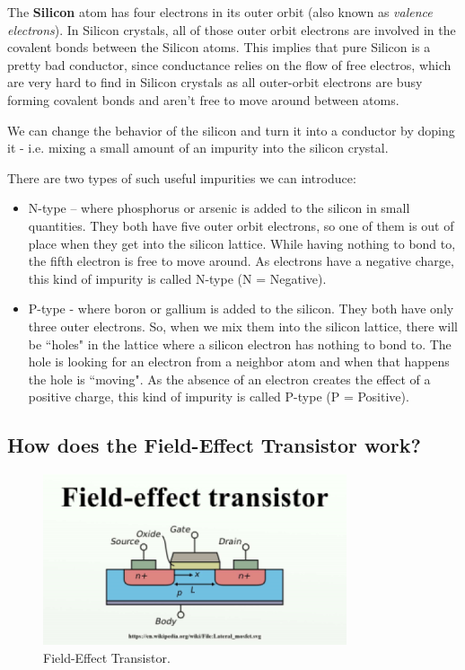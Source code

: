 The \textbf{Silicon} atom has four electrons in its outer orbit (also known as \textit{valence electrons}).
In Silicon crystals, all of those outer orbit electrons are involved in the covalent bonds between the Silicon atoms.
This implies that pure Silicon is a pretty bad conductor, 
since conductance relies on the flow of free electros,
which are very hard to find in Silicon crystals as all outer-orbit electrons are busy forming covalent bonds and aren't free to move around between atoms.

We can change the behavior of the silicon and turn it into a conductor by doping it - i.e. mixing a small amount of an impurity into the silicon crystal.

There are two types of such useful impurities we can introduce:
\begin{itemize}
    \item N-type – where phosphorus or arsenic is added to the silicon in small
    quantities. They both have five outer orbit electrons, so one of them is out of
    place when they get into the silicon lattice. While having nothing to bond
    to, the fifth electron is free to move around. As electrons have a negative
    charge, this kind of impurity is called N-type (N = Negative).
    \item P-type - where boron or gallium is added to the silicon. They both
    have only three outer electrons. So, when we mix them into the silicon
    lattice, there will be ``holes" in the lattice where a silicon electron has
    nothing to bond to. The hole is looking for an electron from a neighbor atom
    and when that happens the hole is ``moving". As the absence of an electron
    creates the effect of a positive charge, this kind of impurity is called
    P-type (P = Positive).
\end{itemize}

\subsection{How does the Field-Effect Transistor work? }

\begin{figure}[!ht]
	\centering
	\includegraphics{images/field_effect_transistor.png}
	\caption{Field-Effect Transistor.} \label{fig:field_effect_transistor}
\end{figure}

